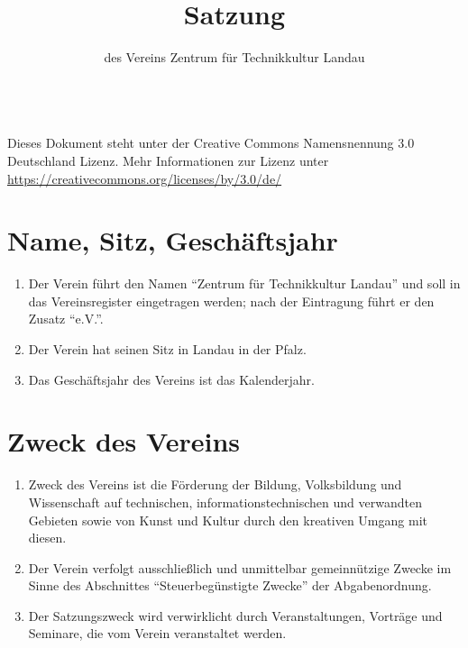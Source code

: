 \documentclass[a4paper, 12pt]{scrartcl}
\begin{document}
\title{Satzung}
\subtitle{des Vereins Zentrum für Technikkultur Landau}
\author{}
\date{}

\maketitle

\tableofcontents

\vfill

\begin{flushright}
	\ccby \\
	{\small
		Dieses Dokument steht unter der Creative Commons Namensnennung 3.0 Deutschland Lizenz. Mehr Informationen zur Lizenz unter \url{https://creativecommons.org/licenses/by/3.0/de/}
	}
\end{flushright}

\newpage
\section{Name, Sitz, Geschäftsjahr}
\begin{enumerate}
	\item Der Verein führt den Namen "`Zentrum für Technikkultur Landau"' und soll in das Vereinsregister eingetragen werden; nach der Eintragung führt er den Zusatz "`e.V."'.
	\item Der Verein hat seinen Sitz in Landau in der Pfalz.
	\item Das Geschäftsjahr des Vereins ist das Kalenderjahr.
\end{enumerate}

\section{Zweck des Vereins}
\begin{enumerate}
	\item Zweck des Vereins ist die Förderung der Bildung, Volksbildung und Wissenschaft auf technischen, informationstechnischen und verwandten Gebieten sowie von Kunst und Kultur durch
den kreativen Umgang mit diesen.
	\item Der Verein verfolgt ausschließlich und unmittelbar gemeinnützige Zwecke im Sinne des Abschnittes "`Steuerbegünstigte Zwecke"' der Abgabenordnung.
	\item Der Satzungszweck wird verwirklicht durch Veranstaltungen, Vorträge und Seminare, die vom Verein veranstaltet werden.
\end{enumerate}
\end{document}
